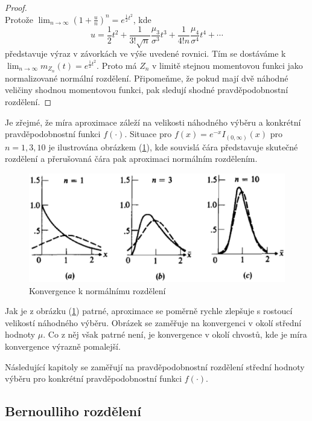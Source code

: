 \begin{proof}
\begin{equation*}
\end{equation*}
Protože $\lim_{n \rightarrow \infty}\left(1 + \frac{u}{n} \right)^n = e^{\frac{1}{2}t^2}$, kde
\begin{equation*}
u = \frac{1}{2}t^2 + \frac{1}{3! \sqrt{n}}\frac{\mu_3}{\sigma^3} t^3 + \frac{1}{4!n}\frac{\mu_4}{\sigma^4}t^4 + \cdots
\end{equation*}
představuje výraz v závorkách ve výše uvedené rovnici. Tím se dostáváme k $\lim_{n \rightarrow \infty} m_{Z_n}(t) = e^{\frac{1}{2}t^2}$. Proto má $Z_n$ v limitě stejnou momentovou funkci jako normalizované normální rozdělení. Připomeňme, že pokud mají dvě náhodné veličiny shodnou momentovou funkci, pak sledují shodné pravděpodobnostní rozdělení.
\end{proof}

Je zřejmé, že míra aproximace záleží na velikosti náhodného výběru a konkrétní pravděpodobnostní funkci $f(\cdot)$. Situace pro $f(x) = e^{-x}I_{(0, \infty)}(x)$ pro $n = 1, 3, 10$ je ilustrována obrázkem (\ref{asymptotic-normal}), kde souvislá čára představuje skutečné rozdělení a přerušovaná čára pak aproximaci normálním rozdělením.

\begin{figure}[htp]
\centering
\includegraphics[scale = 0.5]{pictures/asymptotic_normal.eps}
\caption{Konvergence k normálnímu rozdělení}
\label{asymptotic-normal}
\end{figure}

Jak je z obrázku (\ref{asymptotic-normal}) patrné, aproximace se poměrně rychle zlepšuje s rostoucí velikostí náhodného výběru. Obrázek se zaměřuje na konvergenci v okolí střední hodnoty $\mu$. Co z něj však patrné není, je konvergence v okolí chvostů, kde je míra konvergence výrazně pomalejší.

Následující kapitoly se zaměřují na pravděpodobnostní rozdělení střední hodnoty výběru pro konkrétní pravděpodobnostní funkci $f(\cdot)$.

\subsection{Bernoulliho rozdělení}

